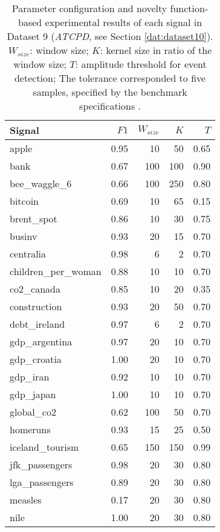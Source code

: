 \begin{table}[h]
\centering
    \caption{Parameter configuration and novelty function-based experimental results of each signal in Dataset 9 (\textit{ATCPD}, see Section \ref{dat:dataset10}). $W_{size}$: window size; $K$: kernel size in ratio of the window size; $T$: amplitude threshold for event detection; The tolerance corresponded to five samples, specified by the benchmark specifications \cite{cpd_alan}.}
    \label{tab:params_results_alanT}
    \begin{tabular}{lrrrr}
    \toprule
    Signal &     $F1$ &    $W_{size}$ &    $K$ &     $T$\\
    \midrule
    apple &  0.95 &   10 &   50 &  0.65 \\
    bank &  0.67 &  100 &  100 &  0.90 \\
    bee\_waggle\_6 &  0.66 &  100 &  250 &  0.80 \\
    bitcoin &  0.69 &   10 &   65 &  0.15 \\
    brent\_spot &  0.86 &   10 &   30 &  0.75 \\
    businv &  0.93 &   20 &   15 &  0.70 \\
    centralia &  0.98 &    6 &    2 &  0.70 \\
    children\_per\_woman &  0.88 &   10 &   10 &  0.70 \\
    co2\_canada &  0.85 &   10 &   20 &  0.35 \\
    construction &  0.93 &   20 &   50 &  0.70 \\
    debt\_ireland &  0.97 &    6 &    2 &  0.70 \\
    gdp\_argentina &  0.97 &   20 &   10 &  0.70 \\
    gdp\_croatia &  1.00 &   20 &   10 &  0.70 \\
    gdp\_iran &  0.92 &   10 &   10 &  0.70 \\
    gdp\_japan &  1.00 &   10 &   10 &  0.70 \\
    global\_co2 &  0.62 &  100 &   50 &  0.70 \\
    homeruns &  0.93 &   15 &   25 &  0.50 \\
    iceland\_tourism &  0.65 &  150 &  150 &  0.99 \\
    jfk\_passengers &  0.98 &   20 &   30 &  0.80 \\
    lga\_passengers &  0.89 &   20 &   30 &  0.80 \\
    measles &  0.17 &   20 &   30 &  0.80 \\
    nile &  1.00 &   20 &   30 &  0.80 \\

\end{tabular}
\end{table}
